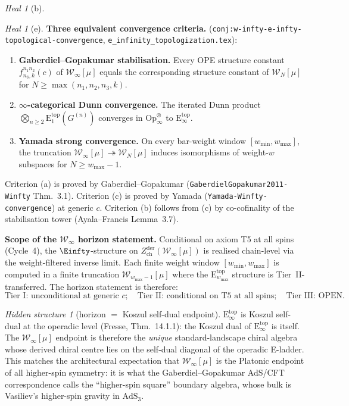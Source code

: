\documentclass{article}
\theoremstyle{definition}
\theoremstyle{remark}
\newtheorem{heal}[theorem]{Heal}
\newtheorem{hidden}[theorem]{Hidden structure}
\newcommand{\Zder}{Z^{\mathrm{der}}_{\mathrm{ch}}}
\newcommand{\Etop}[1]{\mathrm{E}_{#1}^{\mathrm{top}}}
\newcommand{\cW}{\mathcal{W}}
\begin{document}
\begin{heal}[b]
\begin{heal}[e]
\textbf{Three equivalent convergence criteria.}
(\texttt{conj:w-infty-e-infty-topological-convergence},
\texttt{e\_infinity\_topologization.tex}):
\begin{enumerate}[label=\textup{(\alph*)}]
\item \textbf{Gaberdiel--Gopakumar stabilisation.} Every OPE
structure constant $f^{n_1 n_2}_{n_3, k}(c)$ of
$\cW_\infty[\mu]$ equals the corresponding structure constant
of $\cW_N[\mu]$ for $N \ge \max(n_1, n_2, n_3, k)$.
\item \textbf{$\infty$-categorical Dunn convergence.} The
iterated Dunn product $\bigotimes_{n \ge 2} \Etop{1}(G^{(n)})$
converges in $\mathrm{Op}_\infty^{\otimes}$ to
$\Etop{\infty}$.
\item \textbf{Yamada strong convergence.} On every
bar-weight window $[w_{\min}, w_{\max}]$, the truncation
$\cW_\infty[\mu] \twoheadrightarrow \cW_N[\mu]$ induces
isomorphisms of weight-$w$ subspaces for $N \ge w_{\max} - 1$.
\end{enumerate}

Criterion (a) is proved by Gaberdiel--Gopakumar
(\texttt{GaberdielGopakumar2011-Winfty} Thm.~3.1).
Criterion (c) is proved by Yamada
(\texttt{Yamada-Winfty-convergence}) at generic $c$.
Criterion (b) follows from (c) by co-cofinality of the
stabilisation tower (Ayala--Francis Lemma~3.7).

\textbf{Scope of the $\cW_\infty$ horizon statement.}
Conditional on axiom T5 at all spins (Cycle~4), the
$\Einfty$-structure on
$\Zder(\cW_\infty[\mu])$ is realised chain-level via the
weight-filtered inverse limit. Each finite weight window
$[w_{\min}, w_{\max}]$ is computed in a finite truncation
$\cW_{w_{\max}-1}[\mu]$ where the $\Etop{w_{\max}}$
structure is Tier~II-transferred. The horizon statement is
therefore:
\begin{equation}\label{eq:opus-Winfty-conditional}
  \text{Tier~I: unconditional at generic }c;\quad
  \text{Tier~II: conditional on T5 at all spins};\quad
  \text{Tier~III: OPEN.}
\end{equation}

\begin{hidden}[horizon $=$ Koszul self-dual endpoint]
\label{hidden:cycle5}
$\Etop{\infty}$ is Koszul self-dual at the operadic level
(Fresse, Thm.~14.1.1): the Koszul dual of $\Etop{\infty}$
is itself. The $\cW_\infty[\mu]$ endpoint is therefore the
\emph{unique} standard-landscape chiral algebra whose
derived chiral centre lies on the self-dual diagonal of the
operadic E-ladder. This matches the architectural
expectation that $\cW_\infty[\mu]$ is the Platonic endpoint
of all higher-spin symmetry: it is what the
Gaberdiel--Gopakumar AdS/CFT correspondence calls the
``higher-spin square'' boundary algebra, whose bulk is
Vasiliev's higher-spin gravity in $\mathrm{AdS}_3$.
\end{hidden}
\end{heal}


\end{heal}
\end{document}

